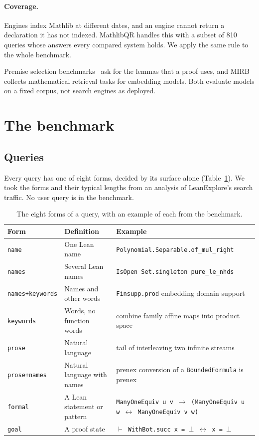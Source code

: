 \documentclass{article}
\newcommand{\thead}[1]{\textbf{#1}}
\newcommand{\rowrule}{\arrayrulecolor{nBorderLight}\specialrule{0.4pt}{3pt}{3pt}\arrayrulecolor{nBorder}}
\newcommand{\code}[1]{\texttt{\small #1}}
\begin{document}
\paragraph{Coverage.} Engines index Mathlib at different dates, and an engine
cannot return a declaration it has not indexed. MathlibQR handles this with a
subset of 810 queries whose answers every compared system holds. We apply the
same rule to the whole benchmark.

Premise selection benchmarks~\cite{yang2023leandojo,tao2025premise} ask for
the lemmas that a proof uses, and MIRB~\cite{ju2025mirb} collects mathematical
retrieval tasks for embedding models. Both evaluate models on a fixed corpus,
not search engines as deployed.

\section{The benchmark}
\label{sec:benchmark}

\subsection{Queries}

Every query has one of eight forms, decided by its surface alone
(Table~\ref{tab:forms}). We took the forms and their typical lengths from an
analysis of LeanExplore's search traffic. No user query is in the benchmark.

\begin{table}[t]
\centering\small
\caption{The eight forms of a query, with an example of each from the
benchmark.}
\label{tab:forms}
\begin{tabularx}{\linewidth}{@{}llX@{}}
\toprule
\thead{Form} & \thead{Definition} & \thead{Example} \\
\midrule
\code{name} & One Lean name & \code{Polynomial.Separable.of\_mul\_right} \\
\rowrule
\code{names} & Several Lean names & \code{IsOpen Set.singleton pure\_le\_nhds} \\
\rowrule
\code{names+keywords} & Names and other words & \code{Finsupp.prod} embedding domain support \\
\rowrule
\code{keywords} & Words, no function words & combine family affine maps into product space \\
\rowrule
\code{prose} & Natural language & tail of interleaving two infinite streams \\
\rowrule
\code{prose+names} & Natural language with names & prenex conversion of a \code{BoundedFormula} is prenex \\
\rowrule
\code{formal} & A Lean statement or pattern & \code{ManyOneEquiv u v $\to$ (ManyOneEquiv u w $\leftrightarrow$ ManyOneEquiv v w)} \\
\rowrule
\code{goal} & A proof state & \code{$\vdash$ WithBot.succ x = $\bot$ $\leftrightarrow$ x = $\bot$} \\
\bottomrule
\end{tabularx}
\end{table}
\end{document}
